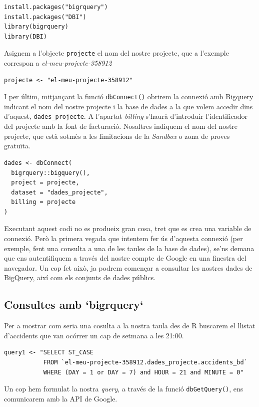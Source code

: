 \documentclass[11pt,longbibliography]{article}
\theoremstyle{definition}
\theoremstyle{remark}
\begin{document}
\begin{verbatim}
install.packages("bigrquery")
install.packages("DBI")
library(bigrquery)
library(DBI)
\end{verbatim}

Asignem a l'objecte \texttt{projecte} el nom del nostre projecte, que a l'exemple correspon a \emph{el-meu-projecte-358912}

\begin{verbatim}
projecte <- "el-meu-projecte-358912"
\end{verbatim}

I per últim, mitjançant la funció \texttt{dbConnect()} obrirem la connexió amb Bigquery indicant el nom del nostre projecte i la base de dades a la que volem accedir dins d'aquest, \texttt{dades\_projecte}. A l'apartat \emph{billing} s'haurà d'introduir l'identificador del projecte amb la font de facturació. Nosaltres indiquem el nom del nostre projecte, que està sotmès a les limitacions de la \emph{Sandbox} o zona de proves gratuïta.

\begin{verbatim}
dades <- dbConnect(
  bigrquery::bigquery(),
  project = projecte,
  dataset = "dades_projecte",
  billing = projecte
)
\end{verbatim}

Executant aquest codi no es produeix gran cosa, tret que es crea una variable de connexió. Però la primera vegada que intentem fer ús d'aquesta connexió (per exemple, fent una consulta a una de les taules de la base de dades), se'ns demana que ens autentifiquem a través del nostre compte de Google en una finestra del navegador. Un cop fet això, ja podrem començar a consultar les nostres dades de BigQuery, així com els conjunts de dades públics. 


\subsection{Consultes amb `bigrquery`}

Per a mostrar com seria una cosulta a la nostra taula des de R buscarem el llistat d'accidents que van ocórrer un cap de setmana a les 21:00.

\begin{verbatim}
query1 <- "SELECT ST_CASE 
           FROM `el-meu-projecte-358912.dades_projecte.accidents_bd`
           WHERE (DAY = 1 or DAY = 7) and HOUR = 21 and MINUTE = 0"
\end{verbatim}

Un cop hem formulat la nostra \emph{query}, a través de la funció \texttt{dbGetQuery()}, ens comunicarem amb la API de Google. 
\end{document}
